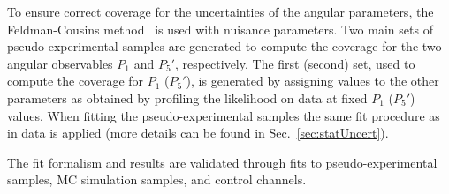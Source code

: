 To ensure correct coverage for the uncertainties of the angular parameters, the Feldman-Cousins method~\cite{FC}
is used with nuisance parameters.
Two main sets of pseudo-experimental samples are generated to compute the coverage for the two angular observables
$P_1$ and $P_5'$, respectively. The first (second) set, used to compute the coverage for $P_1$ ($P_5'$), is generated
by assigning values to the other parameters as obtained by profiling the likelihood on data at fixed $P_1$ ($P_5'$)
values. When fitting the pseudo-experimental samples the same fit procedure as in data is applied (more details can be
found in Sec.~\ref{sec:statUncert}).

The fit formalism and results are validated through fits to pseudo-experimental samples,
MC simulation samples, and control channels.
